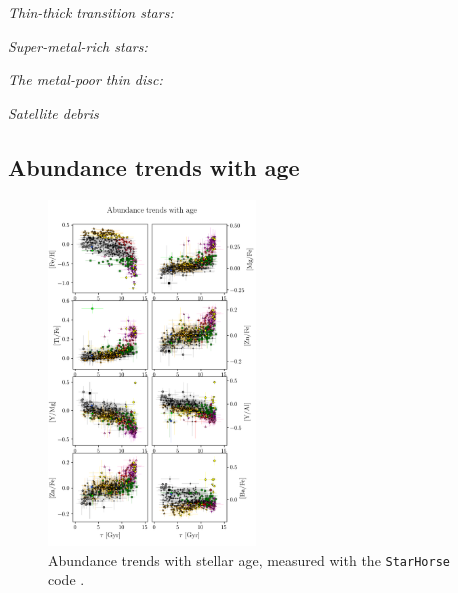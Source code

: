 \documentclass{aa}  %
\begin{document}
{\it Thin-thick transition stars:} 

{\it Super-metal-rich stars:} 

{\it The metal-poor thin disc:} 

{\it Satellite debris} 

\subsection{Abundance trends with age}

\begin{figure}\centering
 \includegraphics[width=0.49\textwidth]{im/harps_tsne-age-abundsplot_teffcut.png}
\caption{Abundance trends with stellar age, measured with the \texttt{StarHorse} code \citep{Queiroz2017}.}
\label{harps2}
\end{figure}
\end{document}
